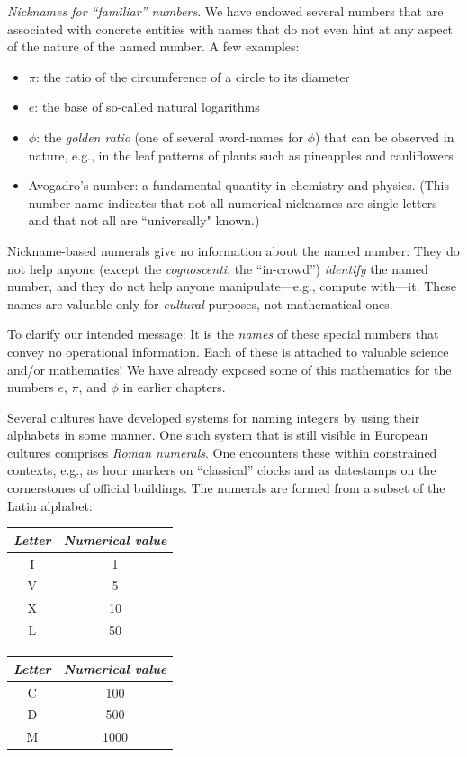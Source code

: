 \noindent
{\it Nicknames for ``familiar'' numbers}.
We have endowed several numbers that are associated with concrete entities with names that do not even hint at any aspect of the nature of the named number.  A few examples:
\begin{itemize}
\item
$\pi$: the ratio of the circumference of a circle to its diameter
\medskip\item
$e$: the base of so-called natural logarithms
\medskip\item
$\phi$: the {\it golden ratio} (one of several word-names for $\phi$) that can be observed in nature, e.g., in the leaf patterns of plants such as pineapples and cauliflowers
\medskip\item
Avogadro's number: a fundamental quantity in chemistry and physics.  (This number-name indicates that not all numerical nicknames are single letters and that not all are ``universally" known.)
\end{itemize}
Nickname-based numerals give no information about the named number:  They do not help anyone (except the {\it cognoscenti}: the ``in-crowd'') {\em identify} the named number, and they do not help anyone manipulate---e.g., compute with---it.  These names are valuable only for {\em cultural} purposes, not mathematical ones.

\smallskip

To clarify our intended message: It is the {\em names} of these special numbers that convey no operational information.  Each of these is attached to valuable science and/or mathematics!  We have already exposed some of this mathematics for the numbers $e$, $\pi$, and $\phi$ in earlier chapters.

\bigskip

 

Several cultures have developed systems for naming integers by using their alphabets in some manner.  One such system that is still visible in European cultures comprises {\it Roman numerals}.  One encounters these within constrained contexts, e.g., as hour markers on ``classical'' clocks and as datestamps on the cornerstones of official buildings.  The numerals
are formed from a subset of the Latin alphabet:

\smallskip

{\small
\begin{tabular}{c|c}
{\it Letter} & {\it Numerical value} \\
\hline
I  & 1 \\
V  & 5 \\
X  & 10 \\
L  & 50
\end{tabular}
\hspace*{.5in}
\begin{tabular}{c|c}
{\it Letter} & {\it Numerical value} \\
\hline
C  & 100 \\
D  & 500 \\
M  & 1000
\end{tabular}
}

